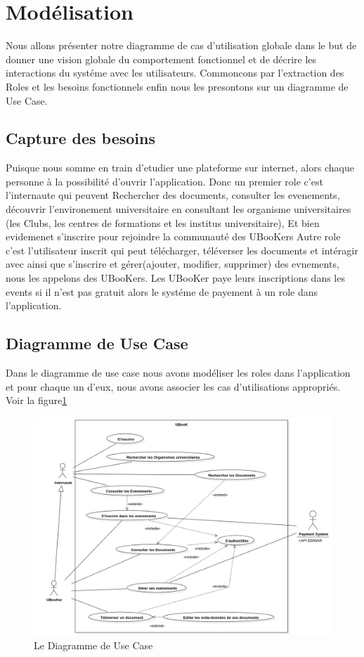 \documentclass[12pt]{report}
\begin{document}
\section{Modélisation}

Nous allons présenter notre diagramme de cas d’utilisation globale dans le but de donner
une vision globale du comportement fonctionnel et de décrire les interactions du systéme
avec les utilisateurs.
Commoncons par l'extraction des Roles et les besoins fonctionnels enfin nous les presontons 
sur un diagramme de Use Case.

\subsection{Capture des besoins}

Puisque nous somme en train d'etudier une plateforme sur internet, alors chaque personne à la 
possibilité d'ouvrir l'application. Donc un premier role c'est l'internaute qui peuvent Rechercher des documents, consulter les evenements, découvrir l'environement universitaire en consultant les organisme universitaires (les Clubs, les centres de formations et les institus universitaire), Et bien evidemenet s'inscrire pour rejoindre la communauté des UBooKers
Autre role c'est l'utilisateur inscrit qui peut télécharger, téléverser les documents et intéragir avec ainsi que s'inscrire et gérer(ajouter, modifier, supprimer) des evnements, nous les appelons des UBooKers.
Les UBooKer paye leurs inscriptions dans les events si il n'est pas gratuit alors le systéme de
payement à un role dans l'application.

\subsection{Diagramme de Use Case}

Dans le diagramme de use case nous avons modéliser les roles dans l'application et pour chaque un d'eux, nous avons associer les cas d'utilisations appropriés. Voir la figure\ref{fig:usecase}

\begin{figure}[hbtp]
    \centering
    \includegraphics[width=1\textwidth]{useCase}
    \caption{Le Diagramme de Use Case}
    \label{fig:usecase}
\end{figure}
\end{document}
